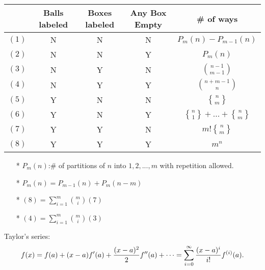\documentclass[a4paper]{amsart}
\newcommand{\stirlingsecond}[2]{\genfrac{\{}{\}}{0pt}{}{#1}{#2}}
\begin{document}
\begin{tabular}{|c|c|c|c|c|}
    \hline
    & Balls labeled & Boxes labeled & Any Box Empty & \# of ways \\ \hline
    $(1)$ & N & N & N & $P_m(n)-P_{m-1}(n)$ \\ \hline
    $(2)$ & N & N & Y & $P_m(n)$ \\ \hline
    $(3)$ & N & Y & N & $\binom{n-1}{m-1}$ \\ \hline
    $(4)$ & N & Y & Y & $\binom{n+m-1}{n}$ \\ \hline
    $(5)$ & Y & N & N & $\stirlingsecond{n}{m}$ \\ \hline
    $(6)$ & Y & N & Y & $\stirlingsecond{n}{1}+...+\stirlingsecond{n}{m}$ \\ \hline
    $(7)$ & Y & Y & N & $m!\stirlingsecond{n}{m}$ \\ \hline
    $(8)$ & Y & Y & Y & $m^n$ \\ \hline
\end{tabular}
\begin{enumerate}
    \item[*] $P_m(n)$:\# of partitions of $n$ into $1,2,...,m$ with repetition allowed.
    \item[*] $P_m(n)=P_{m-1}(n)+P_{m}(n-m)$
    \item[*] $(8)=\sum^m_{i=1}\binom{m}{i}(7)$
    \item[*] $(4)=\sum^m_{i=1}\binom{m}{i}(3)$
\end{enumerate}
Taylor's series:
$$
f(x) = f(a) + (x-a)f'(a) + {(x-a)^2 \over 2} f''(a) + \cdots = \sum_{i=0}^\infty {(x-a)^i \over i!} f^{(i)}(a).
$$




\enlargethispage*{\baselineskip}
\pagebreak






\end{document}
